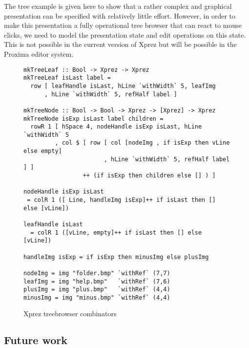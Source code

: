The tree example is given here to show that a rather complex and graphical presentation can be specified with relatively little effort. However, in order to make this presentation a fully operational tree browser that can react to mouse clicks, we need to model the presentation state and edit operations on this state. This is not possible in the current version of {\sc Xprez} but will be possible in the Proxima editor system.
\begin{figure}
\begin{small}
\begin{center}
\begin{footnotesize}
\begin{verbatim}
mkTreeLeaf :: Bool -> Xprez -> Xprez
mkTreeLeaf isLast label = 
  row [ leafHandle isLast, hLine `withWidth` 5, leafImg
      , hLine `withWidth` 5, refHalf label ] 

mkTreeNode :: Bool -> Bool -> Xprez -> [Xprez] -> Xprez
mkTreeNode isExp isLast label children =
  rowR 1 [ hSpace 4, nodeHandle isExp isLast, hLine `withWidth` 5
         , col $ [ row [ col [nodeImg , if isExp then vLine else empty]
                       , hLine `withWidth` 5, refHalf label ] ]
                 ++ (if isExp then children else [] ) ]

nodeHandle isExp isLast 
 = colR 1 ([ Line, handleImg isExp]++ if isLast then [] else [vLine])

leafHandle isLast 
  = colR 1 ([vLine, empty]++ if isLast then [] else [vLine])

handleImg isExp = if isExp then minusImg else plusImg

nodeImg = img "folder.bmp" `withRef` (7,7)
leafImg = img "help.bmp"   `withRef` (7,6)
plusImg = img "plus.bmp"   `withRef` (4,4)
minusImg = img "minus.bmp" `withRef` (4,4)
\end{verbatim}
\end{footnotesize}
\caption{{\sc Xprez} treebrowser combinators}\label{treeCombinators} 
\end{center}
\end{small}
\end{figure}



%																
\subsection{Future work}

